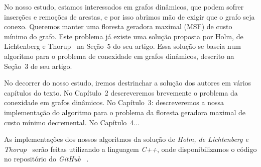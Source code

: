 No nosso estudo, estamos interessados em grafos dinâmicos, que podem sofrer inserções e remoções de arestas, e por isso abrimos mão de exigir que o grafo seja conexo. Queremos manter uma floresta geradora maximal (MSF) de custo mínimo do grafo. Este problema já existe uma solução proposta por Holm, de Lichtenberg e Thorup~\cite{jacob_holm} na Seção~5 do seu artigo. Essa solução se baseia num algoritmo para o problema de conexidade em grafos dinâmicos, descrito na Seção~3 de seu artigo. 

No decorrer do nosso estudo, iremos destrinchar a solução dos autores em vários capítulos do texto. No Capítulo~2 descreveremos brevemente o problema da conexidade em grafos dinâmicos. No Capítulo~3: descreveremos a nossa implementação do algoritmo para o problema da floresta geradora maximal de custo mínimo decremental. No Capítulo~4...

As implementações dos nossos algoritmos da solução de \textit{Holm, de Lichtenberg e Thorup}~\cite{jacob_holm} serão feitas utilizando a linguagem \textit{C++}, onde disponibilizamos o código no repositório do \textit{GitHub} ~\cite{chung2025}.